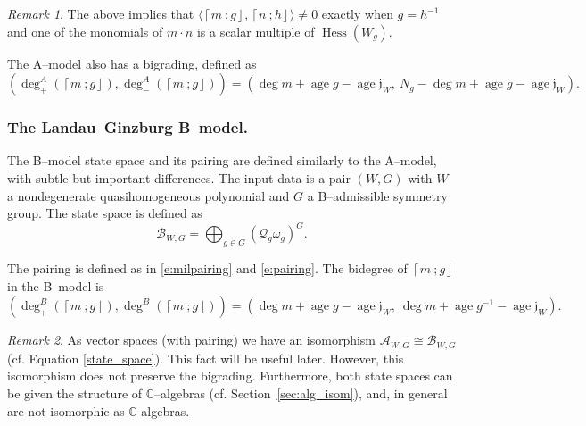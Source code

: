 \documentclass[10pt, letterpaper]{amsart}
\theoremstyle{remark}
\newtheorem{rem}{Remark}[thm]
\newcommand{\CC}{\mathbb C}
\newcommand{\sA}{\mathscr{A}}
\newcommand{\sB}{\mathscr{B}}
\newcommand{\sQ}{\mathscr{Q}}
\newcommand{\fjrw}[2]{ \left\lceil #1 \:; #2 \right\rfloor }
\newcommand{\jw}{\mathfrak{j}}
\DeclareMathOperator{\Hess}{Hess}
\DeclareMathOperator{\age}{age}
\begin{document}
\begin{rem}\label{pairing:conditions}
The above implies that  $\langle\fjrw{m}{g},\fjrw{n}{h} \rangle \neq 0$ exactly when $g = h^{-1}$ and one of the monomials of $m\cdot n$ is a scalar multiple of $\Hess(W_g)$.  
\end{rem}


The A--model also has a bigrading, defined as
\begin{equation}\label{e:fjrwbidegree}
(\deg^A_+(\fjrw{m}{g}), \deg^A_-(\fjrw{m}{g})) = \left(\deg m+\age g-\age\jw_W,\ N_g-\deg m+\age g-\age\jw_W\right).
\end{equation}

\subsubsection*{The Landau--Ginzburg B--model.}
The B--model state space and its pairing are defined similarly to the A--model, with subtle but important differences. 
The input data is a pair $(W, G)$ with $W$ a nondegenerate quasihomogeneous polynomial and $G$ a B--admissible symmetry group. The state space is defined as 
\begin{equation*}\label{e:Bstatespace}
\sB_{W,G} = \bigoplus_{g \in G} \left(\sQ_g \omega_g \right)^G.
\end{equation*}

The pairing is defined as in \eqref{e:milpairing} and \eqref{e:pairing}. The bidegree of $\fjrw{m}{g}$ in the B--model is 
\[
(\deg^B_+(\fjrw{m}{g}), \deg^B_-(\fjrw{m}{g})) = \left(\deg m+\age g-\age\jw_W,\ \deg m+\age g^{-1}-\age\jw_W\right).
\] 

\begin{rem}\label{r:ABiso}
As vector spaces (with pairing) we have an isomorphism $\sA_{W,G}\cong \sB_{W,G}$ (cf. Equation \ref{state_space}). This fact will be useful later. However, this isomorphism does not preserve the bigrading. Furthermore, both state spaces can be given the structure of $\CC$--algebras (cf. Section~\ref{sec:alg_isom}), and, in general are not isomorphic as $\CC$-algebras. 
\end{rem}
\end{document}

